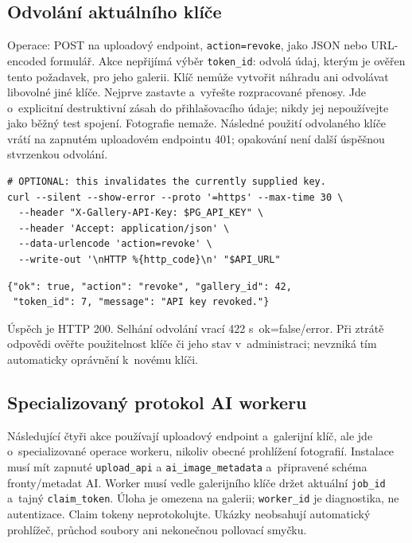 \documentclass[11pt,a4paper]{article}
\newcommand{\codeword}[1]{\nolinkurl{#1}}
\begin{document}
\subsection{\texorpdfstring{Odvolání aktuálního klíče}{Odvolání aktuálního klíče}}

\label{api352:revoke}

Operace: POST na uploadový endpoint, \codeword{action=revoke}, jako JSON nebo URL-encoded
formulář. Akce nepřijímá výběr \codeword{token_id}: odvolá údaj, kterým je ověřen tento
požadavek, pro jeho galerii. Klíč nemůže vytvořit náhradu ani odvolávat libovolné jiné
klíče. Nejprve zastavte a~vyřešte rozpracované přenosy. Jde o~explicitní destruktivní zásah
do přihlašovacího údaje; nikdy jej nepoužívejte jako běžný test spojení. Fotografie nemaže.
Následné použití odvolaného klíče vrátí na zapnutém uploadovém endpointu 401; opakování není
další úspěšnou stvrzenkou odvolání.

\begin{lstlisting}[language={}]
# OPTIONAL: this invalidates the currently supplied key.
curl --silent --show-error --proto '=https' --max-time 30 \
  --header "X-Gallery-API-Key: $PG_API_KEY" \
  --header 'Accept: application/json' \
  --data-urlencode 'action=revoke' \
  --write-out '\nHTTP %{http_code}\n' "$API_URL"
\end{lstlisting}

\begin{lstlisting}[language={}]
{"ok": true, "action": "revoke", "gallery_id": 42,
 "token_id": 7, "message": "API key revoked."}
\end{lstlisting}

Úspěch je HTTP 200. Selhání odvolání vrací 422 s~ok=false/error. Při ztrátě odpovědi ověřte
použitelnost klíče či jeho stav v~administraci; nevzniká tím automaticky oprávnění k~novému
klíči.

\subsection{\texorpdfstring{Specializovaný protokol AI workeru}{Specializovaný protokol AI workeru}}

\label{api352:ai-contract}

Následující čtyři akce používají uploadový endpoint a~galerijní klíč, ale jde
o~specializované operace workeru, nikoliv obecné prohlížení fotografií. Instalace musí mít
zapnuté \codeword{upload_api} a \codeword{ai_image_metadata} a~připravené schéma
fronty/metadat AI. Worker musí vedle galerijního klíče držet aktuální \codeword{job_id}
a~tajný \codeword{claim_token}. Úloha je omezena na galerii; \codeword{worker_id} je
diagnostika, ne autentizace. Claim tokeny neprotokolujte. Ukázky neobsahují automatický
prohlížeč, průchod soubory ani nekonečnou pollovací smyčku.
\end{document}
